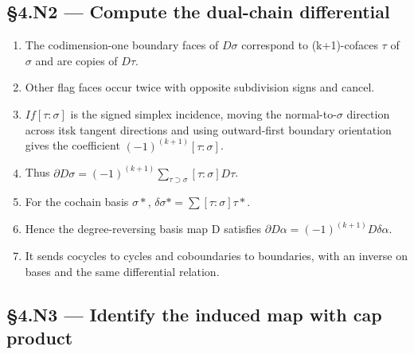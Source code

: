\documentclass[preprint,12pt,aps,pra,showkeys,amsmath,amssymb,superscriptaddress,floatfix]{revtex4-2}
\theoremstyle{definition}
\theoremstyle{remark}
\begin{document}
\subsection{§4.N2 --- Compute the dual-chain
differential}\label{n2-compute-the-dual-chain-differential}

\begin{enumerate}
\def\labelenumi{\arabic{enumi}.}
\item
  The codimension-one boundary faces of \(D\sigma\) correspond to
  (k+1)-cofaces \(\tau\) of \(\sigma\) and are copies of \(D\tau\).
\item
  Other flag faces occur twice with opposite subdivision signs and
  cancel.
\item
  \(If[\tau :\sigma ]\) is the signed simplex incidence, moving the
  normal-to-\(\sigma\) direction across itsk tangent directions and
  using outward-first boundary orientation gives the coefficient
  \((-1)^{(k+1)}[\tau :\sigma ]\).
\item
  Thus
  \(\partial D\sigma =(-1)^{(k+1)}\sum _{\tau \supset \sigma }[\tau :\sigma ]D\tau\).
\item
  For the cochain basis \(\sigma *\),
  \(\delta \sigma *=\sum [\tau :\sigma ]\tau *\).
\item
  Hence the degree-reversing basis map D satisfies
  \(\partial D\alpha =(-1)^{(k+1)}D\delta \alpha\).
\item
  It sends cocycles to cycles and coboundaries to boundaries, with an
  inverse on bases and the same differential relation.
\end{enumerate}

\subsection{§4.N3 --- Identify the induced map with cap
product}\label{n3-identify-the-induced-map-with-cap-product}
\end{document}
